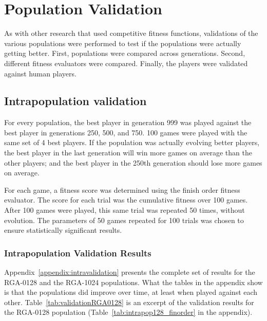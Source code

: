 \section{Population Validation} \label{6_Validation}

As with other research that used competitive fitness functions, validations of
the various populations were performed to test if the populations were actually
getting better. First, populations were compared across generations. Second,
different fitness evaluators were compared. Finally, the players were validated
against human players.

\subsection{Intrapopulation validation}\label{6_intraPopValidation}

For every population, the best player in generation 999 was played against the
best player in generations 250, 500, and 750. 100 games were played with the
same set of 4 best players. If the population was actually evolving better
players, the best player in the last generation will win more games on average
than the other players; and the best player in the 250th generation should lose
more games on average.

For each game, a fitness score was determined using the finish order fitness
evaluator. The score for each trial was the cumulative fitness over 100 games.
After 100 games were played, this same trial was repeated 50 times, without
evolution. The parameters of 50 games repeated for 100 trials was chosen to
ensure statistically significant results.

\subsubsection{Intrapopulation Validation Results}

Appendix~\ref{appendix:intravalidation} presents the complete set of results for
the RGA-0128 and the RGA-1024 populations. What the tables in the appendix show
is that the populations did improve over time, at least when played against each
other. Table~\ref{tab:validationRGA0128} is an excerpt of the validation results
for the RGA-0128 population (Table~\ref{tab:intrapop128_finorder} in the
appendix).

